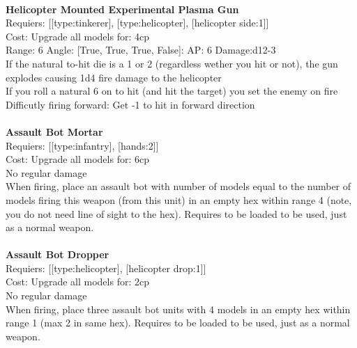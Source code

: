\ \\
{\bf Helicopter Mounted Experimental Plasma Gun } \\

Requiers: [[type:tinkerer], [type:helicopter], [helicopter side:1]] \\
Cost: Upgrade all models for: 4cp \\


Range: 6  Angle: [True, True, True, False]: AP: 6 Damage:d12-3 \\
If the natural to-hit die is a 1 or 2 (regardless wether you hit or not), the gun explodes causing 1d4 fire damage to the helicopter\\ 
If you roll a natural 6 on to hit (and hit the target) you set the enemy on fire\\ 
Difficutly firing forward: Get -1 to hit in forward direction\\ 








\ \\
{\bf Assault Bot Mortar } \\

Requiers: [[type:infantry], [hands:2]] \\
Cost: Upgrade all models for: 6cp \\
No regular damage\\ 
When firing, place an assault bot with number of models equal to the number of models firing this weapon (from this unit) in an empty hex within range 4 (note, you do not need line of sight to the hex). Requires to be loaded to be used, just as a normal weapon.\\ 









\ \\
{\bf Assault Bot Dropper } \\

Requiers: [[type:helicopter], [helicopter drop:1]] \\
Cost: Upgrade all models for: 2cp \\
No regular damage\\ 
When firing, place three assault bot units with 4 models in an empty hex within range 1 (max 2 in same hex). Requires to be loaded to be used, just as a normal weapon.\\ 









